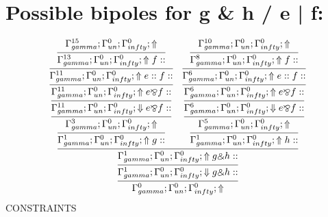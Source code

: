 \documentclass[a4paper, 11pt]{article}
\begin{document}
\section{Possible bipoles for g \& h / e | f:} 

\[
\infer{\Gamma_{ gamma}^{0} ; \Gamma_{un}^{0} ; \Gamma_{ infty}^{0} ;  \Uparrow }
{\infer{\Gamma_{ gamma}^{1} ; \Gamma_{un}^{0} ; \Gamma_{ infty}^{0} ;  \Downarrow g \binampersand h :: }
{\infer{\Gamma_{ gamma}^{1} ; \Gamma_{un}^{0} ; \Gamma_{ infty}^{0} ;  \Uparrow g \binampersand h :: }
{\infer{\Gamma_{ gamma}^{1} ; \Gamma_{un}^{0} ; \Gamma_{ infty}^{0} ;  \Uparrow g :: }
{\infer{\Gamma_{ gamma}^{3} ; \Gamma_{un}^{0} ; \Gamma_{ infty}^{0} ;  \Uparrow }
{\infer{\Gamma_{ gamma}^{11} ; \Gamma_{un}^{0} ; \Gamma_{ infty}^{0} ;  \Downarrow e \bindnasrepma f :: }
{\infer{\Gamma_{ gamma}^{11} ; \Gamma_{un}^{0} ; \Gamma_{ infty}^{0} ;  \Uparrow e \bindnasrepma f :: }
{\infer{\Gamma_{ gamma}^{11} ; \Gamma_{un}^{0} ; \Gamma_{ infty}^{0} ;  \Uparrow e :: f :: }
{\infer{\Gamma_{ gamma}^{13} ; \Gamma_{un}^{0} ; \Gamma_{ infty}^{0} ;  \Uparrow f :: }
{\Gamma_{ gamma}^{15} ; \Gamma_{un}^{0} ; \Gamma_{ infty}^{0} ;  \Uparrow }}}}}}
&
\infer{\Gamma_{ gamma}^{1} ; \Gamma_{un}^{0} ; \Gamma_{ infty}^{0} ;  \Uparrow h :: }
{\infer{\Gamma_{ gamma}^{5} ; \Gamma_{un}^{0} ; \Gamma_{ infty}^{0} ;  \Uparrow }
{\infer{\Gamma_{ gamma}^{6} ; \Gamma_{un}^{0} ; \Gamma_{ infty}^{0} ;  \Downarrow e \bindnasrepma f :: }
{\infer{\Gamma_{ gamma}^{6} ; \Gamma_{un}^{0} ; \Gamma_{ infty}^{0} ;  \Uparrow e \bindnasrepma f :: }
{\infer{\Gamma_{ gamma}^{6} ; \Gamma_{un}^{0} ; \Gamma_{ infty}^{0} ;  \Uparrow e :: f :: }
{\infer{\Gamma_{ gamma}^{8} ; \Gamma_{un}^{0} ; \Gamma_{ infty}^{0} ;  \Uparrow f :: }
{\Gamma_{ gamma}^{10} ; \Gamma_{un}^{0} ; \Gamma_{ infty}^{0} ;  \Uparrow }}}}}}}}}
\]
CONSTRAINTS
\end{document}
